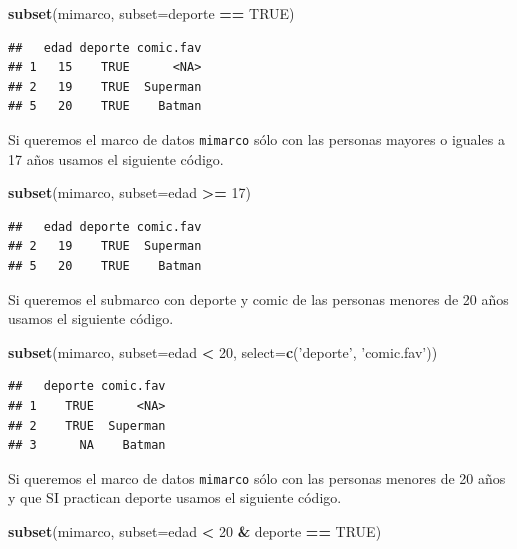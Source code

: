 \documentclass[10pt,]{krantz}
\makeatletter
\newenvironment{Shaded}{\begin{snugshade}}{\end{snugshade}}
\newcommand{\KeywordTok}[1]{\textcolor[rgb]{0.13,0.29,0.53}{\textbf{#1}}}
\newcommand{\DataTypeTok}[1]{\textcolor[rgb]{0.13,0.29,0.53}{#1}}
\newcommand{\DecValTok}[1]{\textcolor[rgb]{0.00,0.00,0.81}{#1}}
\newcommand{\StringTok}[1]{\textcolor[rgb]{0.31,0.60,0.02}{#1}}
\newcommand{\OtherTok}[1]{\textcolor[rgb]{0.56,0.35,0.01}{#1}}
\newcommand{\OperatorTok}[1]{\textcolor[rgb]{0.81,0.36,0.00}{\textbf{#1}}}
\newcommand{\NormalTok}[1]{#1}
\newenvironment{kframe}{%
\medskip{}
\setlength{\fboxsep}{.8em}
 \def\at@end@of@kframe{}%
 \ifinner\ifhmode%
  \def\at@end@of@kframe{\end{minipage}}%
  \begin{minipage}{\columnwidth}%
 \fi\fi%
 \def\FrameCommand##1{\hskip\@totalleftmargin \hskip-\fboxsep
 \colorbox{shadecolor}{##1}\hskip-\fboxsep
     \hskip-\linewidth \hskip-\@totalleftmargin \hskip\columnwidth}%
 \MakeFramed {\advance\hsize-\width
   \@totalleftmargin\z@ \linewidth\hsize
   \@setminipage}}%
 {\par\unskip\endMakeFramed%
 \at@end@of@kframe}
\renewenvironment{Shaded}{\begin{kframe}}{\end{kframe}}
\makeatother
\begin{document}
\begin{Shaded}
\begin{Highlighting}[]
\KeywordTok{subset}\NormalTok{(mimarco, }\DataTypeTok{subset=}\NormalTok{deporte }\OperatorTok{==}\StringTok{ }\OtherTok{TRUE}\NormalTok{)}
\end{Highlighting}
\end{Shaded}

\begin{verbatim}
##   edad deporte comic.fav
## 1   15    TRUE      <NA>
## 2   19    TRUE  Superman
## 5   20    TRUE    Batman
\end{verbatim}

Si queremos el marco de datos \texttt{mimarco} sólo con las personas
mayores o iguales a 17 años usamos el siguiente código.

\begin{Shaded}
\begin{Highlighting}[]
\KeywordTok{subset}\NormalTok{(mimarco, }\DataTypeTok{subset=}\NormalTok{edad }\OperatorTok{>=}\StringTok{ }\DecValTok{17}\NormalTok{)}
\end{Highlighting}
\end{Shaded}

\begin{verbatim}
##   edad deporte comic.fav
## 2   19    TRUE  Superman
## 5   20    TRUE    Batman
\end{verbatim}

Si queremos el submarco con deporte y comic de las personas menores de
20 años usamos el siguiente código.

\begin{Shaded}
\begin{Highlighting}[]
\KeywordTok{subset}\NormalTok{(mimarco, }\DataTypeTok{subset=}\NormalTok{edad }\OperatorTok{<}\StringTok{ }\DecValTok{20}\NormalTok{, }\DataTypeTok{select=}\KeywordTok{c}\NormalTok{(}\StringTok{'deporte'}\NormalTok{, }\StringTok{'comic.fav'}\NormalTok{))}
\end{Highlighting}
\end{Shaded}

\begin{verbatim}
##   deporte comic.fav
## 1    TRUE      <NA>
## 2    TRUE  Superman
## 3      NA    Batman
\end{verbatim}

Si queremos el marco de datos \texttt{mimarco} sólo con las personas
menores de 20 años y que SI practican deporte usamos el siguiente
código.

\begin{Shaded}
\begin{Highlighting}[]
\KeywordTok{subset}\NormalTok{(mimarco, }\DataTypeTok{subset=}\NormalTok{edad }\OperatorTok{<}\StringTok{ }\DecValTok{20} \OperatorTok{&}\StringTok{ }\NormalTok{deporte }\OperatorTok{==}\StringTok{ }\OtherTok{TRUE}\NormalTok{)}
\end{Highlighting}
\end{Shaded}
\end{document}
